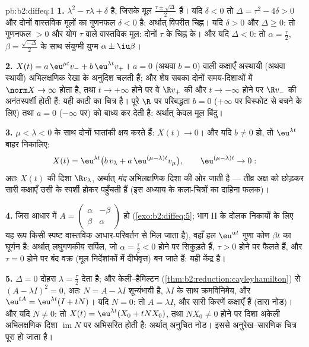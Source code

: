 \begin{solution}{pb:b2:diffeq:1}
\textbf{1.}  $\lambda^2 -
\tau\lambda + \delta$ है, जिसके मूल $\frac{\tau\pm\sqrt\Delta}{2}$ हैं। यदि $\delta < 0$ तो $\Delta =
\tau^2 - 4\delta > 0$ और
दोनों वास्तविक मूलों का गुणनफल $\delta < 0$ है: अर्थात् विपरीत चिह्न। यदि $\delta > 0$ और
$\Delta \geq
0$: तो गुणनफल $> 0$ और योग $\tau$ वाले वास्तविक मूल: दोनों $\tau$ के चिह्न के।
और यदि $\Delta < 0$: तो $\alpha = \frac\tau2$, $\beta =
\frac{\sqrt{-\Delta}}2$ के साथ संयुग्मी युग्म $\alpha \pm
\iu\beta$।

\textbf{2.} $X(t) = a\,\eu^{\mu t}v_- + b\,\eu^{\lambda t}v_+$। $a = 0$ (अथवा $b = 0$) वाली कक्षाएँ अस्थायी (अथवा स्थायी)
अभिलक्षणिक रेखा के अनुदिश चलती हैं; और शेष सबका दोनों समय-दिशाओं में $\norm X \to \infty$
होता है, तथा $t \to
+\infty$ होने पर वे $\R v_+$ की और $t \to -\infty$ होने पर $\R v_-$ की अनंतस्पर्शी
होती हैं: यही काठी का चित्र है। पूरे $\R$ पर परिबद्धता $b = 0$ ($+\infty$ पर विस्फोट
से बचने के लिए) तथा $a = 0$ ($-\infty$ पर) को बाध्य कर देती है: अर्थात् केवल मूल
बिंदु।

\textbf{3.} $\mu < \lambda < 0$ के साथ दोनों घातांकी क्षय करते हैं: $X(t) \to 0$। और यदि $b \neq 0$ हो,
तो $\eu^{\lambda t}$ बाहर निकालिए:
\[
X(t) = \eu^{\lambda t}\bigl(b\,v_\lambda + a\,\eu^{(\mu -
\lambda)t}v_\mu\bigr),
\qquad \eu^{(\mu-\lambda)t} \to 0 :
\]
अतः $X(t)$ की दिशा $\R v_\lambda$, अर्थात् \emph{मंद} अभिलक्षणिक दिशा की ओर जाती है ---
तीव्र अक्ष को छोड़कर सारी कक्षाएँ उसी के स्पर्शी होकर पहुँचती हैं (इस
अध्याय के कला-चित्रों का दाहिना फलक)।

\textbf{4.} जिस आधार में $A = \begin{pmatrix} \alpha &
-\beta\\ \beta & \alpha\end{pmatrix}$ हो (\cref{exo:b2:diffeq:5}; भाग II के दोलक निकायों के लिए यह
रूप किसी स्पष्ट वास्तविक आधार-परिवर्तन से मिल जाता है), वहाँ हल $\eu^{\alpha t}$ गुणा
कोण $\beta
t$ का घूर्णन है: अर्थात् लघुगणकीय सर्पिल, जो $\alpha = \frac\tau2
< 0$ होने पर सिकुड़ते
हैं, $\tau > 0$ होने पर फैलते हैं, और $\tau = 0$ होने पर बंद वक्र (मूल निर्देशांकों में
दीर्घवृत्त) बन जाते हैं: यही केंद्र है।

\textbf{5.} $\Delta = 0$ दोहरा  $\lambda =
\frac\tau2$ देता है; और केली--हैमिल्टन (\cref{thm:b2:reduction:cayleyhamilton})
से $(A - \lambda I)^2 =
0$, अतः $N = A - \lambda I$ शून्यंभावी है, $\lambda I$ के साथ क्रमविनिमेय, और $\eu^{tA} = \eu^{\lambda t}(I + tN)$। यदि $N =
0$:
तो $A = \lambda I$, और सारी किरणें कक्षाएँ हैं (तारा नोड)। और यदि $N
\neq 0$: तो $X(t) = \eu^{\lambda t}(X_0 + tNX_0)$, तथा
$NX_0
\neq 0$ होने पर दिशा अकेली अभिलक्षणिक दिशा $\operatorname{im}N$ पर अभिसरित होती है: अर्थात्
अनुचित नोड। इससे अनुरेख--सारणिक चित्र पूरा हो जाता है।


\end{solution}
